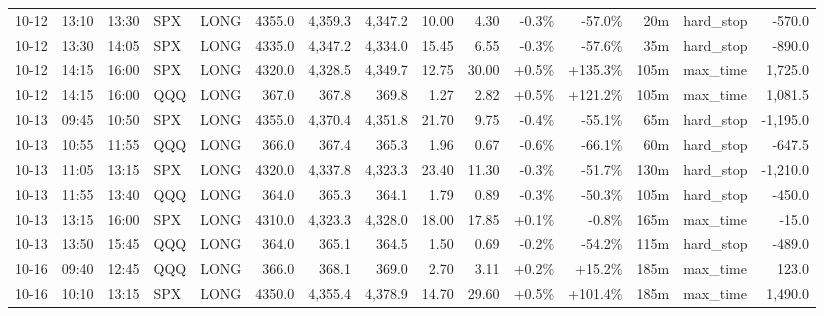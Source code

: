 \documentclass[11pt,a4paper,twoside]{article}
\begin{document}
\begin{landscape}
\begin{center}
\begin{longtable}{>{\color{txtmain}}l l l l l r r r r r r r r >{\color{txtmain}}l r}
10-12 & 13:10 & 13:30 & SPX & LONG & 4355.0 & 4,359.3 & 4,347.2 & 10.00 & 4.30 & \textcolor{lossred}{-0.3\%} & \textcolor{lossred}{-57.0\%} & 20m & hard\_stop & \textcolor{lossred}{-570.0} \\
10-12 & 13:30 & 14:05 & SPX & LONG & 4335.0 & 4,347.2 & 4,334.0 & 15.45 & 6.55 & \textcolor{lossred}{-0.3\%} & \textcolor{lossred}{-57.6\%} & 35m & hard\_stop & \textcolor{lossred}{-890.0} \\
10-12 & 14:15 & 16:00 & SPX & LONG & 4320.0 & 4,328.5 & 4,349.7 & 12.75 & 30.00 & \textcolor{wingreen}{+0.5\%} & \textcolor{wingreen}{+135.3\%} & 105m & max\_time & \textcolor{wingreen}{1,725.0} \\
10-12 & 14:15 & 16:00 & QQQ & LONG & 367.0 & 367.8 & 369.8 & 1.27 & 2.82 & \textcolor{wingreen}{+0.5\%} & \textcolor{wingreen}{+121.2\%} & 105m & max\_time & \textcolor{wingreen}{1,081.5} \\
10-13 & 09:45 & 10:50 & SPX & LONG & 4355.0 & 4,370.4 & 4,351.8 & 21.70 & 9.75 & \textcolor{lossred}{-0.4\%} & \textcolor{lossred}{-55.1\%} & 65m & hard\_stop & \textcolor{lossred}{-1,195.0} \\
10-13 & 10:55 & 11:55 & QQQ & LONG & 366.0 & 367.4 & 365.3 & 1.96 & 0.67 & \textcolor{lossred}{-0.6\%} & \textcolor{lossred}{-66.1\%} & 60m & hard\_stop & \textcolor{lossred}{-647.5} \\
10-13 & 11:05 & 13:15 & SPX & LONG & 4320.0 & 4,337.8 & 4,323.3 & 23.40 & 11.30 & \textcolor{lossred}{-0.3\%} & \textcolor{lossred}{-51.7\%} & 130m & hard\_stop & \textcolor{lossred}{-1,210.0} \\
10-13 & 11:55 & 13:40 & QQQ & LONG & 364.0 & 365.3 & 364.1 & 1.79 & 0.89 & \textcolor{lossred}{-0.3\%} & \textcolor{lossred}{-50.3\%} & 105m & hard\_stop & \textcolor{lossred}{-450.0} \\
10-13 & 13:15 & 16:00 & SPX & LONG & 4310.0 & 4,323.3 & 4,328.0 & 18.00 & 17.85 & \textcolor{wingreen}{+0.1\%} & \textcolor{lossred}{-0.8\%} & 165m & max\_time & \textcolor{lossred}{-15.0} \\
10-13 & 13:50 & 15:45 & QQQ & LONG & 364.0 & 365.1 & 364.5 & 1.50 & 0.69 & \textcolor{lossred}{-0.2\%} & \textcolor{lossred}{-54.2\%} & 115m & hard\_stop & \textcolor{lossred}{-489.0} \\
10-16 & 09:40 & 12:45 & QQQ & LONG & 366.0 & 368.1 & 369.0 & 2.70 & 3.11 & \textcolor{wingreen}{+0.2\%} & \textcolor{wingreen}{+15.2\%} & 185m & max\_time & \textcolor{wingreen}{123.0} \\
10-16 & 10:10 & 13:15 & SPX & LONG & 4350.0 & 4,355.4 & 4,378.9 & 14.70 & 29.60 & \textcolor{wingreen}{+0.5\%} & \textcolor{wingreen}{+101.4\%} & 185m & max\_time & \textcolor{wingreen}{1,490.0} \\

\end{longtable}
\end{center}
\end{landscape}
\end{document}
